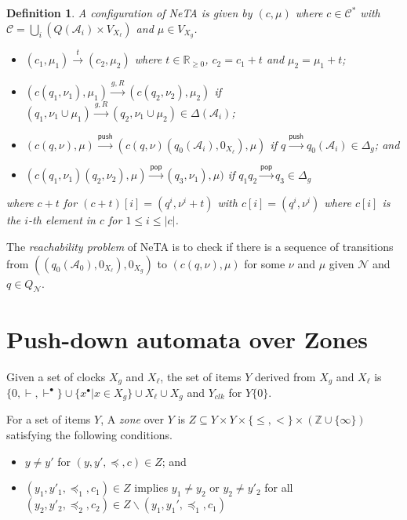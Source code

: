 \documentclass{llncs}
\newtheorem{Def}{Definition}
\newcommand{\pushact}{\mathsf{push}}
\newcommand{\popact}{\mathsf{pop}}
\begin{document}
\begin{Def}
  A {\em configuration} of NeTA is given by $(c,\mu)$ where $c\in\mathcal{C}^\ast$ with 
  $\mathcal{C}=\bigcup_i(Q(\mathcal{A}_i)\times V_{X_\ell})$ and $\mu\in V_{X_g}$.

  \begin{itemize}
    \item $(c_1,\mu_1)\xrightarrow{t}(c_2,\mu_2)$ where $t\in\mathbb{R}_{\geq 0}$, $c_2=c_1+t$ and $\mu_2=\mu_1+t$;
    \item $(c(q_1,\nu_1),\mu_1)\xrightarrow{g,R}(c(q_2,\nu_2),\mu_2)$ if 
    $(q_1,\nu_1\cup \mu_1)\xrightarrow{g,R}(q_2,\nu_1\cup \mu_2)\in\Delta(\mathcal{A}_i)$;
    \item $(c(q,\nu),\mu)\xrightarrow{\pushact}(c(q,\nu)(q_0(\mathcal{A}_i),0_{X_\ell}),\mu)$
    if $q\xrightarrow{\pushact}q_0(\mathcal{A}_i)\in\Delta_g$; and
    \item $(c(q_1,\nu_1)(q_2,\nu_2),\mu)\xrightarrow{\popact}(q_3,\nu_1),\mu)$
    if $q_1q_2\xrightarrow{\popact}q_3\in\Delta_g$
  \end{itemize}

\noindent
  where $c+t$ for $(c+t)[i]=(q^i,\nu^i+t)$ with $c[i]=(q^i,\nu^i)$ where $c[i]$ is the $i$-th element in $c$
  for $1\leq i\leq |c|$.
\end{Def}

The {\em reachability problem} of NeTA is to check if there is a sequence of transitions from 
$((q_0(\mathcal{A}_0),0_{X_\ell}),0_{X_g})$ to $(c(q,\nu),\mu)$ for some $\nu$ and $\mu$
given $\mathcal{N}$ and $q\in Q_\mathcal{N}$.

\section{Push-down automata over Zones}

Given a set of clocks $X_g$ and $X_\ell$, the set of items $Y$ derived from $X_g$ and $X_\ell$ is 
$\{0,\vdash,\vdash^\bullet\}\cup\{x^\bullet|x\in X_g\}\cup X_\ell\cup X_g$ and $Y_{clk}$ for 
$Y\{0\}$.

For a set of items $Y$,
A {\em zone} over $Y$ is $Z\subseteq Y\times Y\times \{\leq,<\}\times(\mathbb{Z}\cup\{\infty\})$
satisfying the following conditions.
\begin{itemize}
  \item $y\not=y'$ for $(y,y',\preceq,c)\in Z$; and
  \item $(y_1,y'_1,\preceq_1,c_1)\in Z$ implies $y_1\not=y_2$ or $y_2\not=y'_2$ for 
  all $(y_2,y'_2,\preceq_2,c_2)\in Z\backslash(y_1,y_1',\preceq_1,c_1)$
\end{itemize}
\end{document}
